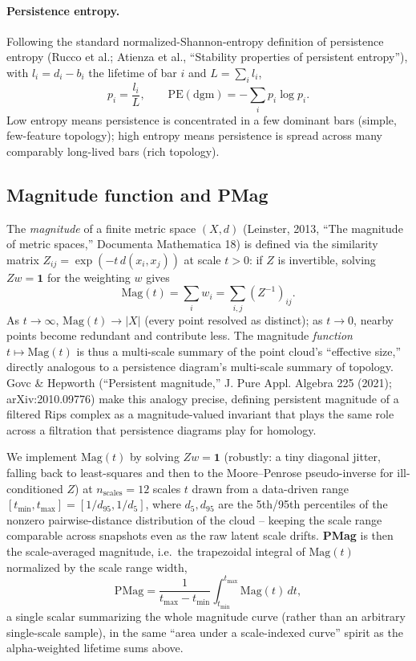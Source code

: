 \documentclass[11pt]{article}
\begin{document}
\paragraph{Persistence entropy.} Following the standard normalized-Shannon-entropy
definition of persistence entropy (Rucco et al.; Atienza et al., ``Stability
properties of persistent entropy''), with $l_i = d_i - b_i$ the lifetime of
bar $i$ and $L = \sum_i l_i$,
\[
  p_i = \frac{l_i}{L}, \qquad
  \mathrm{PE}(\text{dgm}) = -\sum_i p_i \log p_i .
\]
Low entropy means persistence is concentrated in a few dominant bars
(simple, few-feature topology); high entropy means persistence is spread
across many comparably long-lived bars (rich topology).

\subsection{Magnitude function and PMag}

The \emph{magnitude} of a finite metric space $(X,d)$ (Leinster, 2013,
``The magnitude of metric spaces,'' Documenta Mathematica 18) is defined via
the similarity matrix $Z_{ij} = \exp(-t\, d(x_i,x_j))$ at scale $t>0$: if $Z$
is invertible, solving $Zw = \mathbf{1}$ for the weighting $w$ gives
\[
  \mathrm{Mag}(t) = \sum_i w_i = \sum_{i,j} (Z^{-1})_{ij} .
\]
As $t \to \infty$, $\mathrm{Mag}(t) \to |X|$ (every point resolved as
distinct); as $t \to 0$, nearby points become redundant and contribute less.
The magnitude \emph{function} $t \mapsto \mathrm{Mag}(t)$ is thus a
multi-scale summary of the point cloud's ``effective size,'' directly
analogous to a persistence diagram's multi-scale summary of topology.
Govc \& Hepworth (``Persistent magnitude,'' J. Pure Appl. Algebra 225 (2021);
arXiv:2010.09776) make this analogy precise, defining persistent magnitude
of a filtered Rips complex as a magnitude-valued invariant that plays the
same role across a filtration that persistence diagrams play for homology.

We implement $\mathrm{Mag}(t)$ by solving $Zw=\mathbf 1$ (robustly: a tiny
diagonal jitter, falling back to least-squares and then to the Moore--Penrose
pseudo-inverse for ill-conditioned $Z$) at $n_\text{scales}{=}12$ scales
$t$ drawn from a data-driven range $[t_{\min}, t_{\max}] = [1/d_{95},
1/d_{5}]$, where $d_5, d_{95}$ are the 5th/95th percentiles of the nonzero
pairwise-distance distribution of the cloud -- keeping the scale range
comparable across snapshots even as the raw latent scale drifts. \textbf{PMag} is
then the scale-averaged magnitude, i.e.\ the trapezoidal integral of
$\mathrm{Mag}(t)$ normalized by the scale range width,
\[
  \mathrm{PMag} = \frac{1}{t_{\max}-t_{\min}} \int_{t_{\min}}^{t_{\max}}
  \mathrm{Mag}(t)\,dt ,
\]
a single scalar summarizing the whole magnitude curve (rather than an
arbitrary single-scale sample), in the same ``area under a scale-indexed
curve'' spirit as the alpha-weighted lifetime sums above.
\end{document}
